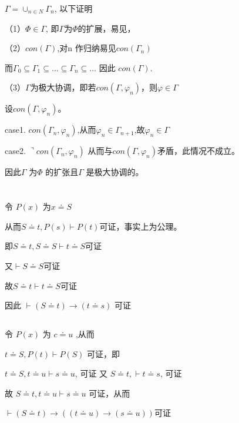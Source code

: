 \documentclass{article}
\begin{document}
\begin{CJK*}{UTF8}{gbsn}
$\Gamma = \cup_{n\in N} \Gamma_n$, 以下证明

（1）$\Phi \in \Gamma$, 即$\Gamma$为$\Phi$的扩展，易见，

（2）$con(\Gamma)$,对n 作归纳易见$con(\Gamma_n)$

而$\Gamma_0 \subseteq \Gamma_1 \subseteq ... \subseteq \Gamma_n \subseteq ...$ 因此 $con(\Gamma)$.

（3）$\Gamma$为极大协调，即若$con(\Gamma,\varphi_n)$，则$\varphi \in \Gamma$ 

设$con(\Gamma,\varphi_n)$。

case1. $con(\Gamma_n,\varphi_n)$,从而$\varphi_n \in \Gamma_{n+1}$,故$\varphi_n \in \Gamma$

case2. $\urcorner con(\Gamma_n,\varphi_n)$ 从而与$con(\Gamma,\varphi_n)$矛盾，此情况不成立。

因此$\Gamma$ 为$\Phi$ 的扩张且$\Gamma$ 是极大协调的。

\section{}

\subsection{}
令 $P(x)$ 为$x \doteq S$

从而$S \doteq t , P(s) \vdash P(t)$可证，事实上为公理。

即$S \doteq t , S\doteq S \vdash t\doteq S$可证

又$\vdash S\doteq S$可证 

故$S\doteq t \vdash t\doteq S$可证

因此 $\vdash (S\doteq t )\rightarrow (t \doteq s)$ 可证

\subsection{}

令 $P(x)$ 为 $c \doteq u$ ,从而 

$t\doteq S , P(t) \vdash P(S)$ 可证，即

$t\doteq S , t \doteq u \vdash s\doteq u$, 可证 又 $S \doteq t , \vdash t \doteq s$, 可证

故 $S\doteq t , t \doteq u \vdash s\doteq u$ 可证，从而

$\vdash (S \doteq t)\rightarrow ((t \doteq u)\rightarrow(s\doteq u))$可证

\section{}


\end{CJK*}
\end{document}
